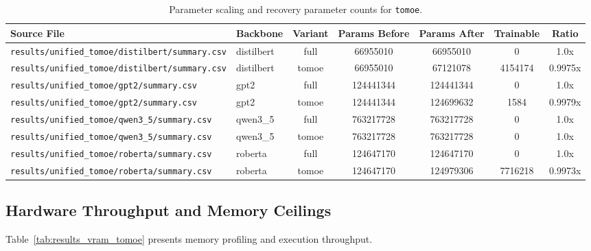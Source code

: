 \begin{table}[t]
\centering
\small
\begin{tabular}{llccccc}
\toprule
\textbf{Source File} & \textbf{Backbone} & \textbf{Variant} & \textbf{Params Before} & \textbf{Params After} & \textbf{Trainable} & \textbf{Ratio} \\
\midrule
\texttt{results/unified\_tomoe/distilbert/summary.csv} & distilbert & full & 66955010 & 66955010 & 0 & 1.0x \\
\texttt{results/unified\_tomoe/distilbert/summary.csv} & distilbert & tomoe & 66955010 & 67121078 & 4154174 & 0.9975x \\
\texttt{results/unified\_tomoe/gpt2/summary.csv} & gpt2 & full & 124441344 & 124441344 & 0 & 1.0x \\
\texttt{results/unified\_tomoe/gpt2/summary.csv} & gpt2 & tomoe & 124441344 & 124699632 & 1584 & 0.9979x \\
\texttt{results/unified\_tomoe/qwen3\_5/summary.csv} & qwen3\_5 & full & 763217728 & 763217728 & 0 & 1.0x \\
\texttt{results/unified\_tomoe/qwen3\_5/summary.csv} & qwen3\_5 & tomoe & 763217728 & 763217728 & 0 & 1.0x \\
\texttt{results/unified\_tomoe/roberta/summary.csv} & roberta & full & 124647170 & 124647170 & 0 & 1.0x \\
\texttt{results/unified\_tomoe/roberta/summary.csv} & roberta & tomoe & 124647170 & 124979306 & 7716218 & 0.9973x \\
\bottomrule
\end{tabular}
\caption{Parameter scaling and recovery parameter counts for \texttt{tomoe}.}
\label{tab:results_params_tomoe}
\end{table}

\subsection{Hardware Throughput and Memory Ceilings}
Table~\ref{tab:results_vram_tomoe} presents memory profiling and execution throughput.

